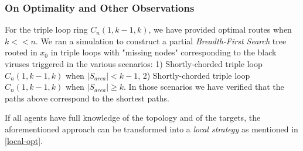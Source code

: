  


\subsubsection{On Optimality and Other Observations}
 

 For the triple loop ring $C_n(1,k-1,k)$, we have  provided optimal routes when $k<<n$. We ran a simulation to construct a partial  {\it Breadth-First Search} tree rooted in $x_0$ 
in triple loops  with "missing nodes" corresponding to the black viruses triggered in the various scenarios:
 1) Shortly-chorded triple loop $C_n(1,k-1,k)$ when $|S_{area}|<k-1$, 2) Shortly-chorded triple loop $C_n(1,k-1,k)$ when $|S_{area}|\ge k$. In those scenarios we have verified that the paths above correspond to the shortest paths.

\medbreak

If all agents have full knowledge of the topology and of the targets, the aforementioned approach can be transformed into a {\em local strategy} as mentioned in \ref{local-opt}.





